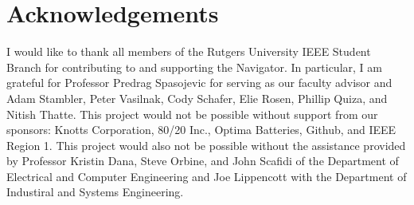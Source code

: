 \documentclass[11pt,twocolumn]{article}
\begin{document}
\section{Acknowledgements}
I would like to thank all members of the Rutgers University IEEE Student Branch
for contributing to and supporting the Navigator. In particular, I am grateful
for Professor Predrag Spasojevic for serving as our faculty advisor and Adam
Stambler, Peter Vasilnak, Cody Schafer, Elie Rosen, Phillip Quiza, and Nitish
Thatte. This project would not be possible without support from our sponsors:
Knotts Corporation, 80/20 Inc., Optima Batteries, Github, and IEEE Region 1.
This project would also not be possible without the assistance provided by
Professor Kristin Dana, Steve Orbine, and John Scafidi of the Department of
Electrical and Computer Engineering and Joe Lippencott with the Department of
Industiral and Systems Engineering.
\end{document}
